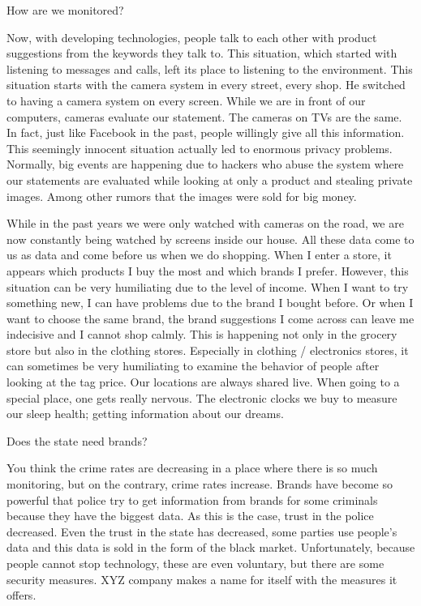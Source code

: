 \documentclass[]{book}
\begin{document}
How are we monitored?

Now, with developing technologies, people talk to each other with product suggestions from the keywords they talk to. This situation, which started with listening to messages and calls, left its place to listening to the environment. This situation starts with the camera system in every street, every shop. He switched to having a camera system on every screen. While we are in front of our computers, cameras evaluate our statement. The cameras on TVs are the same. In fact, just like Facebook in the past, people willingly give all this information. This seemingly innocent situation actually led to enormous privacy problems. Normally, big events are happening due to hackers who abuse the system where our statements are evaluated while looking at only a product and stealing private images. Among other rumors that the images were sold for big money.

While in the past years we were only watched with cameras on the road, we are now constantly being watched by screens inside our house. All these data come to us as data and come before us when we do shopping. When I enter a store, it appears which products I buy the most and which brands I prefer. However, this situation can be very humiliating due to the level of income. When I want to try something new, I can have problems due to the brand I bought before. Or when I want to choose the same brand, the brand suggestions I come across can leave me indecisive and I cannot shop calmly. This is happening not only in the grocery store but also in the clothing stores. Especially in clothing / electronics stores, it can sometimes be very humiliating to examine the behavior of people after looking at the tag price. Our locations are always shared live. When going to a special place, one gets really nervous. The electronic clocks we buy to measure our sleep health; getting information about our dreams.

Does the state need brands?

You think the crime rates are decreasing in a place where there is so much monitoring, but on the contrary, crime rates increase. Brands have become so powerful that police try to get information from brands for some criminals because they have the biggest data. As this is the case, trust in the police decreased. Even the trust in the state has decreased, some parties use people's data and this data is sold in the form of the black market. Unfortunately, because people cannot stop technology, these are even voluntary, but there are some security measures. XYZ company makes a name for itself with the measures it offers.
\end{document}
